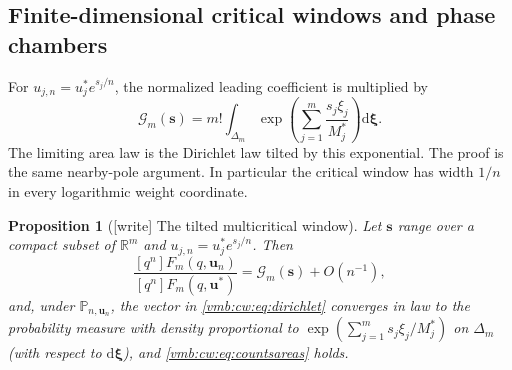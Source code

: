 \documentclass[11pt,a4paper]{article}
\numberwithin{equation}{section}
\newtheorem{proposition}[theorem]{Proposition}
\theoremstyle{definition}\newtheorem{definition}[theorem]{Definition}
\theoremstyle{remark}\newtheorem{remark}[theorem]{Remark}
\newcommand{\Prob}{\mathbb P}
\newcommand{\coeff}[2]{[#1^{#2}]}
\newcommand{\dd}{\mathrm d}
\begin{document}
\subsection{Finite-dimensional critical windows and phase chambers}
For $u_{j,n}=u_j^*e^{s_j/n}$, the normalized leading coefficient is multiplied
by
\begin{equation}\label{vmb:cw:eq:multiwindow}
 \mathcal G_m(\bm s)=m!\int_{\Delta_m}
 \exp\left(\sum_{j=1}^m\frac{s_j\xi_j}{M_j^*}\right)\dd\bm \xi.
\end{equation}
The limiting area law is the Dirichlet law tilted by this exponential.
The proof is the same nearby-pole argument. In particular the critical
window has width $1/n$ in every logarithmic weight coordinate.

\begin{proposition}[{[write]} The tilted multicritical window]\label{vmb:cw:prop:tilted}
Let $\bm s$ range over a compact subset of $\mathbb R^m$ and
$u_{j,n}=u_j^*e^{s_j/n}$. Then
\[
 \frac{\coeff qn F_m(q,\bm u_n)}{\coeff qn F_m(q,\bm u^*)}
 =\mathcal G_m(\bm s)+O(n^{-1}),
\]
and, under $\Prob_{n,\bm u_n}$, the vector in \eqref{vmb:cw:eq:dirichlet}
converges in law to the probability measure with density proportional to
$\exp(\sum_{j=1}^m s_j\xi_j/M_j^*)$ on $\Delta_m$ (with respect to
$\dd\bm\xi$), and \eqref{vmb:cw:eq:countsareas} holds.
\end{proposition}
\end{document}

